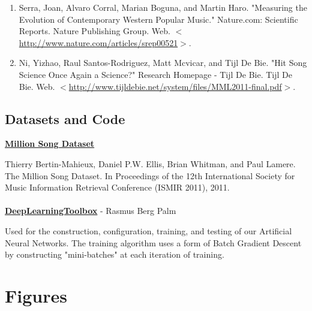 \documentclass[12pt]{article}
\begin{document}
\begin{enumerate}
    \item Serra, Joan, Alvaro Corral, Marian Boguna, and Martin Haro. "Measuring the Evolution of Contemporary Western Popular Music." Nature.com: Scientific Reports. Nature Publishing Group. Web. $<$\href{http://www.nature.com/articles/srep00521}{http://www.nature.com/articles/srep00521}$>$.\vspace{-1ex}
    
    \item Ni, Yizhao, Raul Santos-Rodriguez, Matt Mcvicar, and Tijl De Bie. "Hit Song Science Once Again a Science?" Research Homepage - Tijl De Bie. Tijl De Bie. Web. $<$\href{http://www.tijldebie.net/system/files/MML2011-final.pdf}{http://www.tijldebie.net/system/files/MML2011-final.pdf}$>$.

\end{enumerate}
\subsection{Datasets and Code}
\label{subsec:datasetsAndCode}
\href{http://labrosa.ee.columbia.edu/millionsong/}{\textbf{Million Song Dataset}}

Thierry Bertin-Mahieux, Daniel P.W. Ellis, Brian Whitman, and Paul Lamere. 
The Million Song Dataset. In Proceedings of the 12th International Society
for Music Information Retrieval Conference (ISMIR 2011), 2011.
\\
\\
\href{https://github.com/rasmusbergpalm/DeepLearnToolbox}{\textbf{DeepLearningToolbox}} - Rasmus Berg Palm

Used for the construction, configuration, training, and testing of our Artificial Neural Networks. The training algorithm uses a form of Batch Gradient Descent by constructing "mini-batches" at each iteration of training.
\appendix
\section{Figures}
\label{sec:figures}
\end{document}
